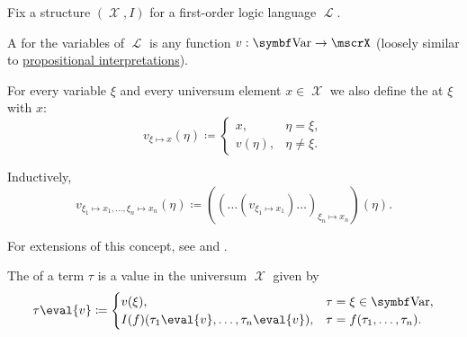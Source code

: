 \begin{definition}\label{def:first_order_valuation}
  Fix a structure \( (\mscrX, I) \) for a first-order logic language \( \mscrL \).

  \begin{defenum}
     A  for the variables of \( \mscrL \) is any function \( v: \bfop{Var} \to \mscrX \) (loosely similar to \hyperref[def:propositional_valuation/interpretation]{propositional interpretations}).

     For every variable \( \xi \) and every universum element \( x \in \mscrX \) we also define the  at \( \xi \) with \( x \):
    \begin{equation*}
      v_{\xi \mapsto x}(\eta) \coloneqq \begin{cases}
        x,       &\eta = \xi, \\
        v(\eta), &\eta \neq \xi.
      \end{cases}
    \end{equation*}

    Inductively\IND,
    \begin{equation*}
      v_{\xi_1 \mapsto x_1, \ldots, \xi_n \mapsto x_n}(\eta) \coloneqq ((\ldots(v_{\xi_1 \mapsto x_1})\ldots)_{\xi_n \mapsto x_n})(\eta).
    \end{equation*}

    For extensions of this concept, see  and .

     The  of a term \( \tau \) is a value in the universum \( \mscrX \) given by
    \begin{equation}\label{eq:def:first_order_valuation/term_valuation}
      \tau\eval{v} \coloneqq \begin{cases}
        v(\xi),                                     &\tau = \xi \in \bfop{Var}, \\
        I(f)(\tau_1\eval{v}, \ldots, \tau_n\eval{v}), &\tau = f(\tau_1, \ldots, \tau_n).
      \end{cases}
    \end{equation}


\end{defenum}
\end{definition}

